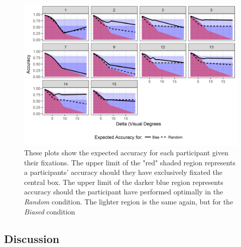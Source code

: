 \documentclass[12pt]{article}
\begin{document}
\begin{figure}[ht!]
	\includegraphics[scale=0.9]{Figures/Experiment_4_prob/Estimated_Accuracy_both}
	\centering
	\captionsetup{justification=centering}
	\caption{These plots show the expected accuracy for each participant given their fixations. The upper limit of the "red" shaded region represents a participants' accuracy should they have exclusively fixated the central box. The upper limit of the darker blue region represents accuracy should the participant have performed optimally in the \textit{Random} condition. The lighter region is the same again, but for the \textit{Biased} condition}
	\label{fig:Session2-prob-accresults}
\end{figure}

\subsection*{Discussion}
\end{document}
